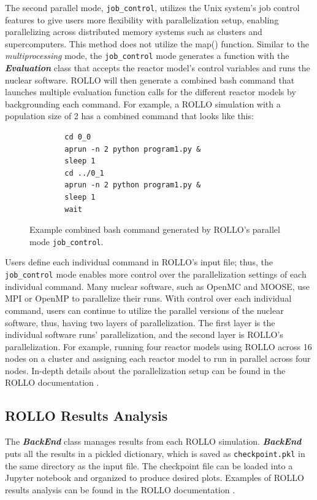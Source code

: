 The second parallel mode, \texttt{job\_control}, utilizes the Unix system's job control 
features to give users more flexibility with parallelization setup, enabling 
parallelizing across distributed memory systems such as clusters and supercomputers. 
This method does not utilize the map() function. 
Similar to the \textit{multiprocessing} mode, the \texttt{job\_control} mode generates a 
function with the \textbf{\textit{Evaluation}} class that accepts the reactor model's control 
variables and runs the nuclear software. 
\gls{ROLLO} will then generate a combined bash command that launches multiple evaluation 
function calls for the different reactor models by backgrounding each command.
For example, a ROLLO simulation with a population size of 2 has a combined command that
looks like this:
\begin{figure}[H]
    \centering
    \begin{minipage}{0.5\textwidth}
    \begin{verbatim}
        cd 0_0
        aprun -n 2 python program1.py &
        sleep 1 
        cd ../0_1 
        aprun -n 2 python program1.py &
        sleep 1 
        wait
    \end{verbatim}
    \end{minipage}
    \caption{Example combined bash command generated by \gls{ROLLO}'s parallel mode \texttt{job\_control}.}
    \label{fig:job-control-example}
\end{figure}
Users define each individual command in ROLLO's input file; thus, the \texttt{job\_control} mode enables more 
control over the parallelization settings of each individual command. 
Many nuclear software, such as OpenMC and MOOSE, use \gls{MPI} or OpenMP to parallelize their runs. 
With control over each individual command, users can continue to utilize the parallel 
versions of the nuclear software, thus, having two layers of parallelization. 
The first layer is the individual software runs' parallelization, and the second layer is ROLLO's parallelization. 
For example, running four reactor models using ROLLO across 16 nodes on a cluster and assigning each reactor 
model to run in parallel across four nodes. 
In-depth details about the parallelization setup can be found in the \gls{ROLLO} documentation
 \cite{chee_documentation_2021}.

\subsection{ROLLO Results Analysis}
The \textbf{\textit{BackEnd}} class manages results from each \gls{ROLLO} simulation. 
\textbf{\textit{BackEnd}} puts all the results in a pickled dictionary, which 
is saved as \texttt{checkpoint.pkl} in the same directory as the input file. 
The checkpoint file can be loaded into a Jupyter notebook and organized 
to produce desired plots. 
Examples of \gls{ROLLO} results analysis can be found in the \gls{ROLLO} documentation 
\cite{chee_documentation_2021}. 

